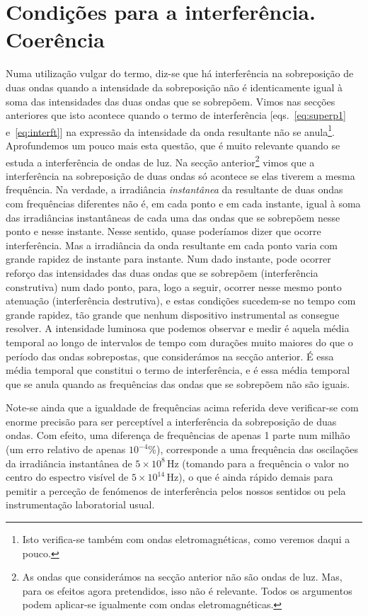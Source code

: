 \section{Condições para a interferência. Coerência}
Numa utilização vulgar do termo, diz-se que há interferência na sobreposição de
duas ondas quando a intensidade da sobreposição não é identicamente igual à soma
das intensidades das duas ondas que se sobrepõem. Vimos nas secções anteriores
que isto acontece quando o termo de interferência [eqs.~\eqref{eq:superp1}
e~\eqref{eq:interft}] na expressão da intensidade da onda resultante não se
anula\footnote{Isto verifica-se também com ondas eletromagnéticas, como veremos
daqui a pouco.}.  Aprofundemos um pouco mais esta questão, que é muito relevante
quando se estuda a interferência de ondas de luz. Na secção anterior\footnote{As
ondas que considerámos na secção anterior não são ondas de luz. Mas, para os
efeitos agora pretendidos, isso não é relevante. Todos os argumentos podem
aplicar-se igualmente com ondas eletromagnéticas.} vimos que a interferência na
sobreposição de duas ondas só acontece se elas tiverem a mesma frequência. Na
verdade, a irradiância \emph{instantânea} da resultante de duas ondas com
frequências diferentes não é, em cada ponto e em cada instante, igual à soma das
irradiâncias instantâneas de cada uma das ondas que se sobrepõem nesse ponto e
nesse instante. Nesse sentido, quase poderíamos dizer que ocorre interferência.
Mas a irradiância da onda resultante em cada ponto varia com grande rapidez de
instante para instante. Num dado instante, pode ocorrer reforço das intensidades
das duas ondas que se sobrepõem (interferência construtiva) num dado ponto,
para, logo a seguir, ocorrer nesse mesmo ponto atenuação (interferência
destrutiva), e estas condições sucedem-se no tempo com grande rapidez, tão
grande que nenhum dispositivo instrumental as consegue resolver. A intensidade
luminosa que podemos observar e medir é aquela média temporal ao longo de
intervalos de tempo com durações muito maiores do que o período das ondas
sobrepostas, que considerámos na secção anterior. É essa média temporal que
constitui o termo de interferência, e é essa média temporal que se anula quando
as frequências das ondas que se sobrepõem não são iguais.

Note-se ainda que a igualdade de frequências acima referida deve verificar-se
com enorme precisão para ser perceptível a interferência da sobreposição de duas
ondas. Com efeito, uma diferença de frequências de apenas 1 parte num milhão (um
erro relativo de apenas $10^{-4}$\%), corresponde a uma frequência das
oscilações da irradiância instantânea de $5\times10^8$\,Hz (tomando para a
frequência o valor no centro do espectro visível de $5\times10^{14}$\,Hz), o que
é ainda rápido demais para pemitir a perceção de fenómenos de interferência
pelos nossos sentidos ou pela instrumentação laboratorial usual. 

